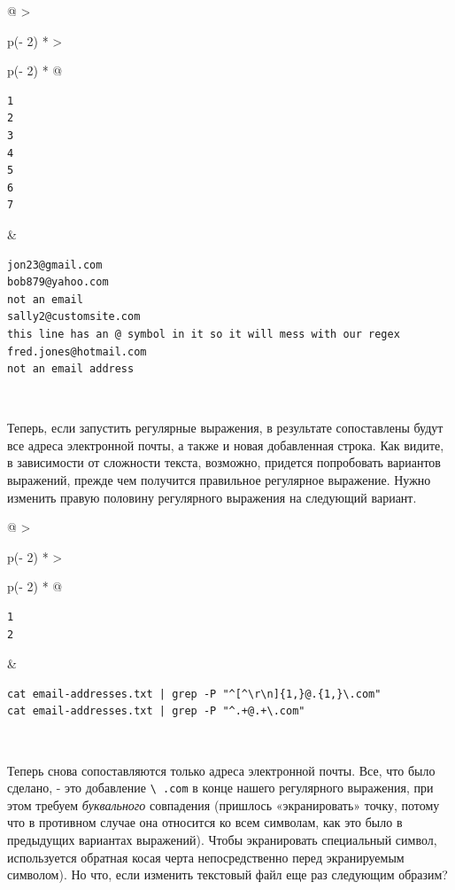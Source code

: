 \documentclass{report}
\begin{document}
\begin{longtable}[]{@{}
  >{\raggedright\arraybackslash}p{(\columnwidth - 2\tabcolsep) * }
  >{\raggedright\arraybackslash}p{(\columnwidth - 2\tabcolsep) * }@{}}
\toprule
\endhead
\begin{minipage}[t]{\linewidth}\raggedright
\begin{verbatim}
1
2
3
4
5
6
7
\end{verbatim}
\end{minipage} & \begin{minipage}[t]{\linewidth}\raggedright
\begin{verbatim}
jon23@gmail.com
bob879@yahoo.com
not an email
sally2@customsite.com
this line has an @ symbol in it so it will mess with our regex
fred.jones@hotmail.com
not an email address
\end{verbatim}
\end{minipage} \\ \addlinespace
\bottomrule
\end{longtable}

Теперь, если запустить регулярные выражения, в результате сопоставлены
будут все адреса электронной почты, а также и новая добавленная строка.
Как видите, в зависимости от сложности текста, возможно, придется
попробовать вариантов выражений, прежде чем получится правильное
регулярное выражение. Нужно изменить правую половину регулярного
выражения на следующий вариант.

\begin{longtable}[]{@{}
  >{\raggedright\arraybackslash}p{(\columnwidth - 2\tabcolsep) * }
  >{\raggedright\arraybackslash}p{(\columnwidth - 2\tabcolsep) * }@{}}
\toprule
\endhead
\begin{minipage}[t]{\linewidth}\raggedright
\begin{verbatim}
1
2
\end{verbatim}
\end{minipage} & \begin{minipage}[t]{\linewidth}\raggedright
\begin{verbatim}
cat email-addresses.txt | grep -P "^[^\r\n]{1,}@.{1,}\.com"
cat email-addresses.txt | grep -P "^.+@.+\.com"
\end{verbatim}
\end{minipage} \\ \addlinespace
\bottomrule
\end{longtable}

Теперь снова сопоставляются только адреса электронной почты. Все, что
было сделано, - это добавление \texttt{\textbackslash{}\ .com} в конце
нашего регулярного выражения, при этом требуем \emph{буквального}
совпадения (пришлось «экранировать» точку, потому что в противном случае
она относится ко всем символам, как это было в предыдущих вариантах
выражений). Чтобы экранировать специальный символ, используется обратная
косая черта непосредственно перед экранируемым символом). Но что, если
изменить текстовый файл еще раз следующим образим?
\end{document}
